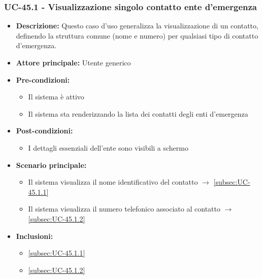 \documentclass[a4paper,12pt]{article}
\begin{document}
\subsubsection{UC-45.1 - Visualizzazione singolo contatto ente d'emergenza} \label{subsec:UC-45.1}
\begin{itemize}
    \item \textbf{Descrizione:} Questo caso d'uso generalizza la visualizzazione di un contatto, definendo la struttura comune (nome e numero) per qualsiasi tipo di contatto d'emergenza.
    \item \textbf{Attore principale:} Utente generico
    \item \textbf{Pre-condizioni:} 
    \begin{itemize}
        \item Il sistema è attivo
        \item Il sistema sta renderizzando la lista dei contatti degli enti d'emergenza
    \end{itemize}
    \item \textbf{Post-condizioni:}
    \begin{itemize}
        \item I dettagli essenziali dell'ente sono visibili a schermo
    \end{itemize}
    \item \textbf{Scenario principale:} 
    \begin{itemize}
        \item Il sistema visualizza il nome identificativo del contatto $\rightarrow$ \ref{subsec:UC-45.1.1}
        \item Il sistema visualizza il numero telefonico associato al contatto $\rightarrow$ \ref{subsec:UC-45.1.2}
    \end{itemize}
    \item \textbf{Inclusioni:}
    \begin{itemize}
        \item \ref{subsec:UC-45.1.1}
        \item \ref{subsec:UC-45.1.2}
    \end{itemize}
\end{itemize}
\end{document}
